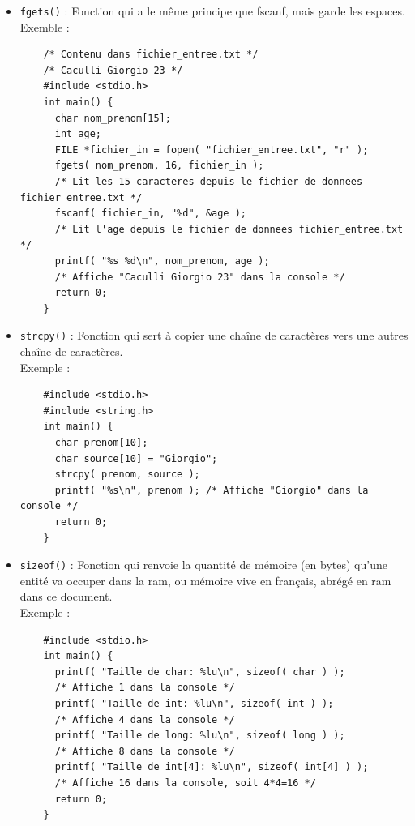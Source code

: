 \documentclass[11pt]{article}
\begin{document}
\begin{itemize}
\item \texttt{fgets()} : Fonction qui a le même principe que fscanf, mais garde les espaces.\\
  Exemble :
  \begin{lstlisting}
    /* Contenu dans fichier_entree.txt */
    /* Caculli Giorgio 23 */
    #include <stdio.h>
    int main() {
      char nom_prenom[15];
      int age;
      FILE *fichier_in = fopen( "fichier_entree.txt", "r" );
      fgets( nom_prenom, 16, fichier_in );
      /* Lit les 15 caracteres depuis le fichier de donnees fichier_entree.txt */
      fscanf( fichier_in, "%d", &age );
      /* Lit l'age depuis le fichier de donnees fichier_entree.txt */
      printf( "%s %d\n", nom_prenom, age );
      /* Affiche "Caculli Giorgio 23" dans la console */
      return 0;
    }
  \end{lstlisting}
  
\item \texttt{strcpy()} : Fonction qui sert à copier une chaîne de caractères vers une autres chaîne de caractères.\\
  Exemple :
  \begin{lstlisting}
    #include <stdio.h>
    #include <string.h>
    int main() {
      char prenom[10];
      char source[10] = "Giorgio";
      strcpy( prenom, source );
      printf( "%s\n", prenom ); /* Affiche "Giorgio" dans la console */
      return 0;
    }
  \end{lstlisting}
  
\item \texttt{sizeof()} : Fonction qui renvoie la quantité de mémoire (en bytes) qu'une entité va occuper dans la \acrlong{ram}, ou mémoire vive en français, abrégé en \acrshort{ram} dans ce document.\\
  Exemple :
  \begin{lstlisting}
    #include <stdio.h>
    int main() {
      printf( "Taille de char: %lu\n", sizeof( char ) );
      /* Affiche 1 dans la console */
      printf( "Taille de int: %lu\n", sizeof( int ) );
      /* Affiche 4 dans la console */
      printf( "Taille de long: %lu\n", sizeof( long ) );
      /* Affiche 8 dans la console */
      printf( "Taille de int[4]: %lu\n", sizeof( int[4] ) );
      /* Affiche 16 dans la console, soit 4*4=16 */
      return 0;
    }
  \end{lstlisting}


\end{itemize}
\end{document}
